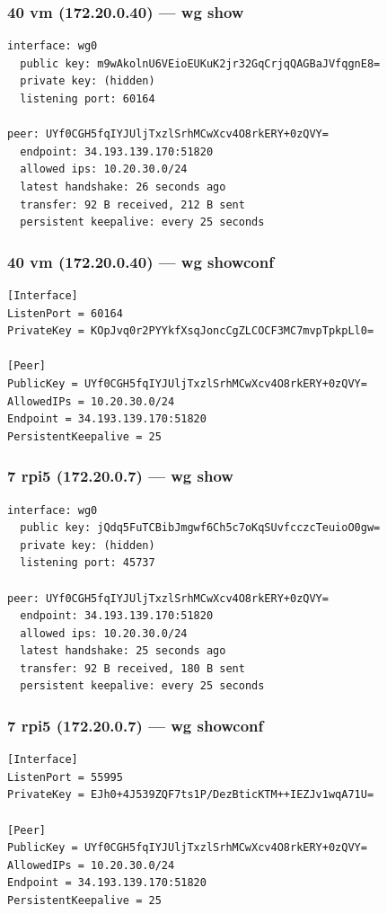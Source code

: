 \documentclass[11pt,a4paper]{article}
\begin{document}
\subsubsection*{40 vm (172.20.0.40) — wg show}
\begin{lstlisting}
interface: wg0
  public key: m9wAkolnU6VEioEUKuK2jr32GqCrjqQAGBaJVfqgnE8=
  private key: (hidden)
  listening port: 60164

peer: UYf0CGH5fqIYJUljTxzlSrhMCwXcv4O8rkERY+0zQVY=
  endpoint: 34.193.139.170:51820
  allowed ips: 10.20.30.0/24
  latest handshake: 26 seconds ago
  transfer: 92 B received, 212 B sent
  persistent keepalive: every 25 seconds

\end{lstlisting}

\subsubsection*{40 vm (172.20.0.40) — wg showconf}
\begin{lstlisting}
[Interface]
ListenPort = 60164
PrivateKey = KOpJvq0r2PYYkfXsqJoncCgZLCOCF3MC7mvpTpkpLl0=

[Peer]
PublicKey = UYf0CGH5fqIYJUljTxzlSrhMCwXcv4O8rkERY+0zQVY=
AllowedIPs = 10.20.30.0/24
Endpoint = 34.193.139.170:51820
PersistentKeepalive = 25

\end{lstlisting}

\subsubsection*{7 rpi5 (172.20.0.7) — wg show}
\begin{lstlisting}
interface: wg0
  public key: jQdq5FuTCBibJmgwf6Ch5c7oKqSUvfcczcTeuioO0gw=
  private key: (hidden)
  listening port: 45737

peer: UYf0CGH5fqIYJUljTxzlSrhMCwXcv4O8rkERY+0zQVY=
  endpoint: 34.193.139.170:51820
  allowed ips: 10.20.30.0/24
  latest handshake: 25 seconds ago
  transfer: 92 B received, 180 B sent
  persistent keepalive: every 25 seconds

\end{lstlisting}

\subsubsection*{7 rpi5 (172.20.0.7) — wg showconf}
\begin{lstlisting}
[Interface]
ListenPort = 55995
PrivateKey = EJh0+4J539ZQF7ts1P/DezBticKTM++IEZJv1wqA71U=

[Peer]
PublicKey = UYf0CGH5fqIYJUljTxzlSrhMCwXcv4O8rkERY+0zQVY=
AllowedIPs = 10.20.30.0/24
Endpoint = 34.193.139.170:51820
PersistentKeepalive = 25

\end{lstlisting}
\end{document}
